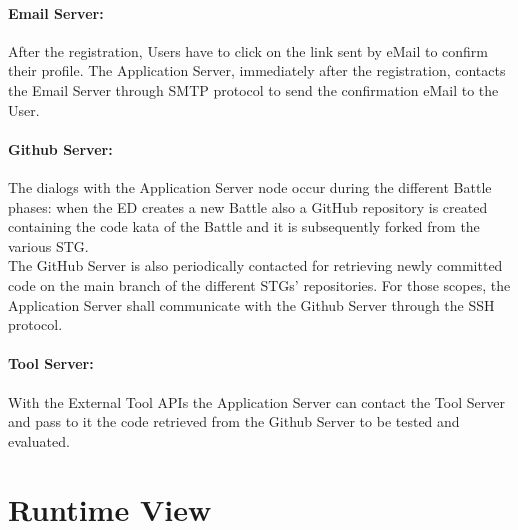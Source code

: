 \paragraph{Email Server:}
After the registration, Users have to click on the link sent by eMail to confirm their profile. The Application Server, immediately after the registration, contacts the Email Server through SMTP protocol to send the confirmation eMail to the User.

\paragraph{Github Server:}
The dialogs with the Application Server node occur during the different Battle phases: when the ED creates a new Battle also a GitHub repository is created containing the code kata of the Battle and it is subsequently forked from the various STG.\\
The GitHub Server is also periodically contacted for retrieving newly committed code on the main branch of the different STGs' repositories.
For those scopes, the Application Server shall communicate with the Github Server through the SSH protocol.


\paragraph{Tool Server:}
With the External Tool APIs the Application Server can contact the Tool Server and pass to it the code retrieved from the Github Server to be tested and evaluated.

\newpage
\section{Runtime View}
\label{sec:runtime_view}%

